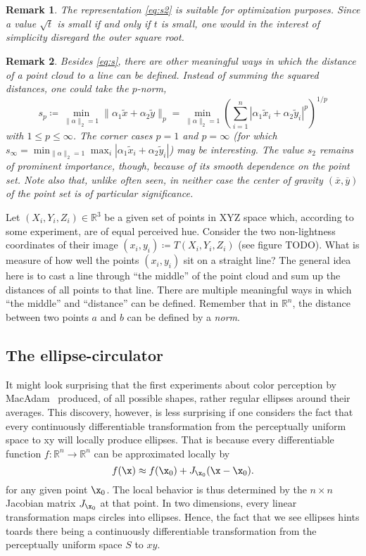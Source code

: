 \documentclass{scrartcl}
\newtheorem*{remark}{Remark}
\theoremstyle{named}
\newcommand\R{\ensuremath{\mathbb{R}}}
\begin{document}
\begin{remark}
  The representation \eqref{eq:s2} is suitable for optimization purposes. Since a value
  $\sqrt{t}$ is small if and only if $t$ is small, one would in the interest of
  simplicity disregard the outer square root.
\end{remark}

\begin{remark}
Besides \eqref{eq:s}, there are other meaningful ways in which the distance of a point
cloud to a line can be defined. Instead of summing the squared distances, one could take
the $p$-norm,
\[
s_p
  \coloneqq \min_{\|\alpha\|_2=1} \|\alpha_1 \tilde{x} + \alpha_2\tilde{y}\|_p
= \min_{\|\alpha\|_2=1}
  \left(\sum_{i=1}^n |\alpha_1 \tilde{x}_i + \alpha_2 \tilde{y}_i|^p\right)^{1/p}
\]
  with $1\le p \le \infty$. The corner cases $p=1$ and $p=\infty$ (for which
  $s_{\infty}=\min_{\|\alpha\|_2=1} \max_i |\alpha_1 \tilde{x}_i + \alpha_2
  \tilde{y}_i|$) may be interesting. The value $s_2$ remains of prominent importance,
  though, because of its smooth dependence on the point set.
  Note also that, unlike often seen, in neither case the center of gravity
  $(\overline{x}, \overline{y})$ of the point set is of particular significance.
\end{remark}



\appendix

Let $(X_i, Y_i, Z_i)\in\R^3$ be a given set of points in XYZ space which, according to
some experiment, are of equal perceived hue. Consider the two non-lightness coordinates
of their image $(x_i, y_i) \coloneqq T(X_i, Y_i, Z_i)$ (see figure TODO). What is
measure of how well the points $(x_i, y_i)$ sit on a straight line? The general idea
here is to cast a line through ``the middle'' of the point cloud and sum up the
distances of all points to that line. There are multiple meaningful ways in which
``the middle'' and ``distance'' can be defined. Remember that in $\R^n$, the distance
between two points $a$ and $b$ can be defined by a \emph{norm}.



\subsection{The ellipse-circulator}

It might look surprising that the first experiments about color
perception by MacAdam~\cite{macadam} produced, of all possible shapes, rather regular
ellipses around their averages. This discovery, however, is less surprising if one
considers the fact that every continuously differentiable transformation from the
perceptually uniform space to xy will locally produce ellipses. That is because every
differentiable function $f:\R^n\to\R^n$ can be approximated locally by
\[
  f(\x) \approx f(\x_0) + J_{\x_0} (\x - \x_0).
\]
for any given point $\x_0$. The local behavior is thus determined by the $n\times n$
Jacobian matrix $J_{\x_0}$ at that point. In two dimensions, every linear transformation
maps circles into ellipses. Hence, the fact that we see ellipses hints toards there
being a continuously differentiable transformation from the perceptually uniform space
$S$ to $xy$.
\end{document}

